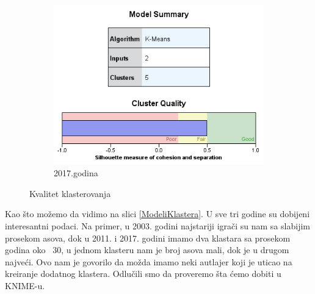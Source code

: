 \documentclass[a4paper]{article}
\begin{document}
\begin{figure}[H]
	\vspace{1cm}
	\begin{subfigure}[h]{\textwidth}
		\begin{center}
			\includegraphics[scale=0.50]{Klasterovanje/Model_KMeans2017_Silhouette.png}
		\end{center}
		\caption{2017.godina}
		\label{fig:SPSS_Silueta2017}
	\end{subfigure}
	
	\caption{Kvalitet klasterovanja}
	\label{Siluete}
\end{figure}

Kao što možemo da vidimo na slici \ref{ModeliKlastera}. U sve tri godine su dobijeni interesantni podaci. Na primer, u 2003. godini najstariji igrači su nam sa slabijim prosekom asova, dok u 2011. i 2017. godini imamo dva klastara sa prosekom godina oko ~30, u jednom klasteru nam je broj asova mali, dok je u drugom najveći. Ovo nam je govorilo da možda imamo neki autlajer koji je uticao na kreiranje dodatnog klastera. Odlučili smo da proveremo šta ćemo dobiti u KNIME-u.
\end{document}
